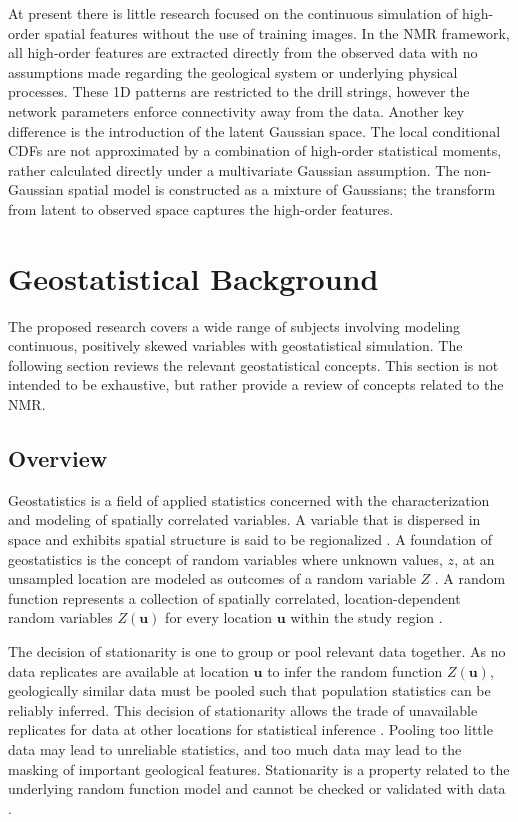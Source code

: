 At present there is little research focused on the continuous simulation of high-order spatial features without the use of training images. In the \gls{NMR} framework, all high-order features are extracted directly from the observed data with no assumptions made regarding the geological system or underlying physical processes. These \gls{1D} patterns are restricted to the drill strings, however the network parameters enforce connectivity away from the data. Another key difference is the introduction of the latent Gaussian space. The local conditional \glspl{CDF} are not approximated by a combination of high-order statistical moments, rather calculated directly under a multivariate Gaussian assumption. The non-Gaussian spatial model is constructed as a mixture of Gaussians; the transform from latent to observed space captures the high-order features.


\FloatBarrier
\section{Geostatistical Background}
\label{sec:01geostatreview}

The proposed research covers a wide range of subjects involving modeling continuous, positively skewed variables with geostatistical simulation. The following section reviews the relevant geostatistical concepts. This section is not intended to be exhaustive, but rather provide a review of concepts related to the \gls{NMR}.

\FloatBarrier
\subsection{Overview}
\label{subsec:01overview}

Geostatistics is a field of applied statistics concerned with the characterization and modeling of spatially correlated variables. A variable that is dispersed in space and exhibits spatial structure is said to be regionalized \citep{matheron2019matheron}. A foundation of geostatistics is the concept of random variables where unknown values, $z$, at an unsampled location are modeled as outcomes of a random variable $Z$ \citep{deutsch1992geostatistical}. A random function represents a collection of spatially correlated, location-dependent random variables $Z(\mathbf{u})$ for every location $\mathbf{u}$ within the study region \citep{goovaerts1997geostatistics}.

The decision of stationarity is one to group or pool relevant data together. As no data replicates are available at location $\mathbf{u}$ to infer the random function $Z(\mathbf{u})$, geologically similar data must be pooled such that population statistics can be reliably inferred. This decision of stationarity allows the trade of unavailable replicates for data at other locations for statistical inference \citep{deutsch1992geostatistical}. Pooling too little data may lead to unreliable statistics, and too much data may lead to the masking of important geological features. Stationarity is a property related to the underlying random function model and cannot be checked or validated with data \citep{goovaerts1997geostatistics}.

